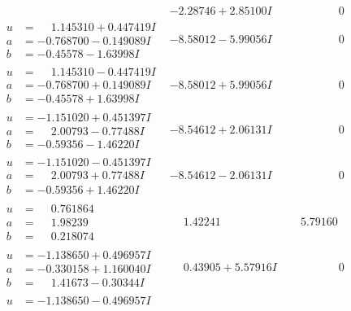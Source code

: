 \documentclass[1p]{elsarticle_modified}
\theoremstyle{definition}
\begin{document}
$$\begin{array}{c|c|c}
 & -2.28746 + 2.85100 I & \phantom{-0.000000 } 0 \\ \hline\begin{aligned}
u &= \phantom{-}1.145310 + 0.447419 I \\
a &= -0.768700 - 0.149089 I \\
b &= -0.45578 - 1.63998 I\end{aligned}
 & -8.58012 - 5.99056 I & \phantom{-0.000000 } 0 \\ \hline\begin{aligned}
u &= \phantom{-}1.145310 - 0.447419 I \\
a &= -0.768700 + 0.149089 I \\
b &= -0.45578 + 1.63998 I\end{aligned}
 & -8.58012 + 5.99056 I & \phantom{-0.000000 } 0 \\ \hline\begin{aligned}
u &= -1.151020 + 0.451397 I \\
a &= \phantom{-}2.00793 - 0.77488 I \\
b &= -0.59356 - 1.46220 I\end{aligned}
 & -8.54612 + 2.06131 I & \phantom{-0.000000 } 0 \\ \hline\begin{aligned}
u &= -1.151020 - 0.451397 I \\
a &= \phantom{-}2.00793 + 0.77488 I \\
b &= -0.59356 + 1.46220 I\end{aligned}
 & -8.54612 - 2.06131 I & \phantom{-0.000000 } 0 \\ \hline\begin{aligned}
u &= \phantom{-}0.761864\phantom{ +0.000000I} \\
a &= \phantom{-}1.98239\phantom{ +0.000000I} \\
b &= \phantom{-}0.218074\phantom{ +0.000000I}\end{aligned}
 & \phantom{-}1.42241\phantom{ +0.000000I} & \phantom{-}5.79160\phantom{ +0.000000I} \\ \hline\begin{aligned}
u &= -1.138650 + 0.496957 I \\
a &= -0.330158 + 1.160040 I \\
b &= \phantom{-}1.41673 - 0.30344 I\end{aligned}
 & \phantom{-}0.43905 + 5.57916 I & \phantom{-0.000000 } 0 \\ \hline\begin{aligned}
u &= -1.138650 - 0.496957 I \\

\end{aligned}
\end{array}$$
\end{document}
